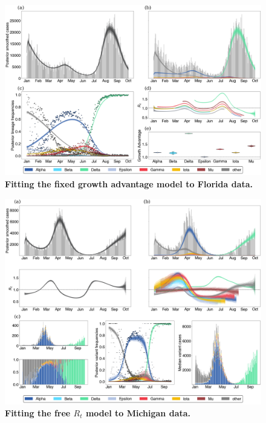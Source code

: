 \documentclass[11pt,oneside,letterpaper]{article}
\begin{document}
\begin{figure}
  \centering
  \includegraphics[width=\linewidth]{figs/fixed_growth_Florida.png}
  \caption{\textbf{Fitting the fixed growth advantage model to Florida data.}}%
  \label{fig:fixed_growth_Florida}
\end{figure}

\begin{figure}
  \centering
  \includegraphics[width=\linewidth]{figs/free_rt_Michigan.png}
  \caption{\textbf{Fitting the free $R_{t}$ model to Michigan data.}}%
  \label{fig:free_rt_Michigan}
\end{figure}
\end{document}
